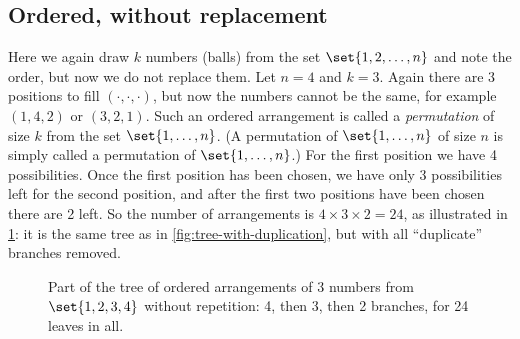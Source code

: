\subsection{Ordered, without replacement}\label{sec:count-ordered-without}

Here we again draw $k$ numbers (balls) from the set $\set{1, 2, \ldots, n}$ and note the order, but now we do not replace them. Let $n = 4$ and $k = 3$. Again there are 3 positions to fill $(\cdot, \cdot, \cdot)$, but now the numbers cannot be the same, for example $(1, 4, 2)$ or $(3, 2, 1)$. Such an ordered arrangement is called a \emph{permutation} of size $k$ from the set $\set{1, \ldots, n}$. (A permutation of $\set{1, \ldots, n}$ of size $n$ is simply called a permutation of $\set{1, \ldots, n}$.) For the first position we have 4 possibilities. Once the first position has been chosen, we have only 3 possibilities left for the second position, and after the first two positions have been chosen there are 2 left. So the number of arrangements is $4 \times 3 \times 2 = 24$, as illustrated in \cref{fig:tree-without-duplication}: it is the same tree as in \cref{fig:tree-with-duplication}, but with all ``duplicate'' branches removed.

\begin{figure}[ht]
\centering
{}
\caption{Part of the tree of ordered arrangements of 3 numbers from $\set{1, 2, 3, 4}$ without repetition: 4, then 3, then 2 branches, for 24 leaves in all.}
\label{fig:tree-without-duplication}
\end{figure}

